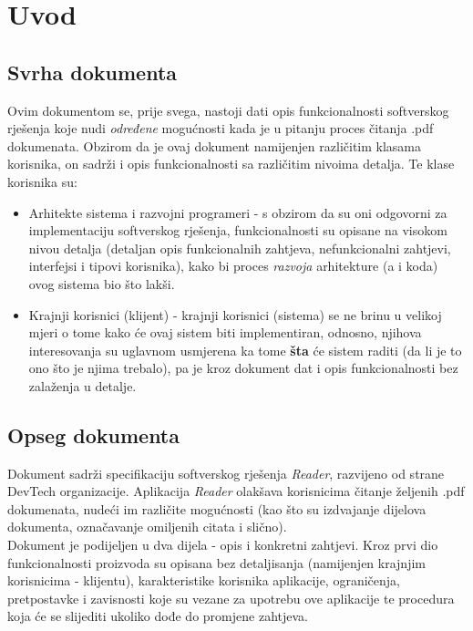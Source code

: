 \chapter{Uvod}

\section{Svrha dokumenta}

Ovim dokumentom se, prije svega, nastoji dati opis funkcionalnosti softverskog rješenja koje nudi \textit{određene} mogućnosti kada je u pitanju proces čitanja .pdf dokumenata. Obzirom da je ovaj dokument namijenjen različitim klasama korisnika, on sadrži i opis funkcionalnosti sa različitim nivoima detalja. Te klase korisnika su:
\begin{itemize}
    \item Arhitekte sistema i razvojni programeri - s obzirom da su oni odgovorni za implementaciju softverskog rješenja, funkcionalnosti su opisane na visokom nivou detalja (detaljan opis funkcionalnih zahtjeva, nefunkcionalni zahtjevi, interfejsi i tipovi korisnika), kako bi proces \textit{razvoja} arhitekture (a i koda) ovog sistema bio što lakši.
    \item Krajnji korisnici (klijent) - krajnji korisnici (sistema) se ne brinu u velikoj mjeri o tome kako će ovaj sistem biti implementiran, odnosno, njihova interesovanja su uglavnom usmjerena ka tome \textbf{šta} će sistem raditi (da li je to ono što je njima trebalo), pa je kroz dokument dat i opis funkcionalnosti bez zalaženja u detalje.
\end{itemize}

\section{Opseg dokumenta}

Dokument sadrži specifikaciju softverskog rješenja \textit{Reader}, razvijeno od strane DevTech organizacije. Aplikacija \textit{Reader} olakšava korisnicima čitanje željenih .pdf dokumenata, nudeći im različite mogućnosti (kao što su izdvajanje dijelova dokumenta, označavanje omiljenih citata i slično). \\

Dokument je podijeljen u dva dijela - opis i konkretni zahtjevi. Kroz prvi dio funkcionalnosti proizvoda su opisana bez detaljisanja (namijenjen krajnjim korisnicima - klijentu), karakteristike korisnika aplikacije, ograničenja, pretpostavke i zavisnosti koje su vezane za upotrebu ove aplikacije te procedura koja će se slijediti ukoliko dođe do promjene zahtjeva.\\ 

